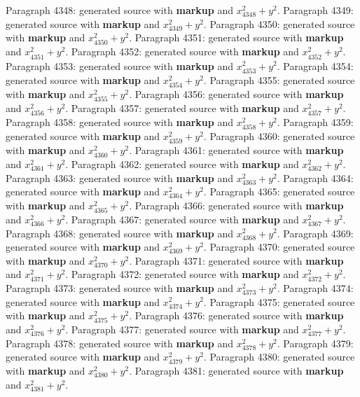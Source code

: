 \documentclass{article}
\begin{document}
Paragraph 4348: generated source with \textbf{markup} and $x_{4348}^2 + y^2$.
Paragraph 4349: generated source with \textbf{markup} and $x_{4349}^2 + y^2$.
Paragraph 4350: generated source with \textbf{markup} and $x_{4350}^2 + y^2$.
Paragraph 4351: generated source with \textbf{markup} and $x_{4351}^2 + y^2$.
Paragraph 4352: generated source with \textbf{markup} and $x_{4352}^2 + y^2$.
Paragraph 4353: generated source with \textbf{markup} and $x_{4353}^2 + y^2$.
Paragraph 4354: generated source with \textbf{markup} and $x_{4354}^2 + y^2$.
Paragraph 4355: generated source with \textbf{markup} and $x_{4355}^2 + y^2$.
Paragraph 4356: generated source with \textbf{markup} and $x_{4356}^2 + y^2$.
Paragraph 4357: generated source with \textbf{markup} and $x_{4357}^2 + y^2$.
Paragraph 4358: generated source with \textbf{markup} and $x_{4358}^2 + y^2$.
Paragraph 4359: generated source with \textbf{markup} and $x_{4359}^2 + y^2$.
Paragraph 4360: generated source with \textbf{markup} and $x_{4360}^2 + y^2$.
Paragraph 4361: generated source with \textbf{markup} and $x_{4361}^2 + y^2$.
Paragraph 4362: generated source with \textbf{markup} and $x_{4362}^2 + y^2$.
Paragraph 4363: generated source with \textbf{markup} and $x_{4363}^2 + y^2$.
Paragraph 4364: generated source with \textbf{markup} and $x_{4364}^2 + y^2$.
Paragraph 4365: generated source with \textbf{markup} and $x_{4365}^2 + y^2$.
Paragraph 4366: generated source with \textbf{markup} and $x_{4366}^2 + y^2$.
Paragraph 4367: generated source with \textbf{markup} and $x_{4367}^2 + y^2$.
Paragraph 4368: generated source with \textbf{markup} and $x_{4368}^2 + y^2$.
Paragraph 4369: generated source with \textbf{markup} and $x_{4369}^2 + y^2$.
Paragraph 4370: generated source with \textbf{markup} and $x_{4370}^2 + y^2$.
Paragraph 4371: generated source with \textbf{markup} and $x_{4371}^2 + y^2$.
Paragraph 4372: generated source with \textbf{markup} and $x_{4372}^2 + y^2$.
Paragraph 4373: generated source with \textbf{markup} and $x_{4373}^2 + y^2$.
Paragraph 4374: generated source with \textbf{markup} and $x_{4374}^2 + y^2$.
Paragraph 4375: generated source with \textbf{markup} and $x_{4375}^2 + y^2$.
Paragraph 4376: generated source with \textbf{markup} and $x_{4376}^2 + y^2$.
Paragraph 4377: generated source with \textbf{markup} and $x_{4377}^2 + y^2$.
Paragraph 4378: generated source with \textbf{markup} and $x_{4378}^2 + y^2$.
Paragraph 4379: generated source with \textbf{markup} and $x_{4379}^2 + y^2$.
Paragraph 4380: generated source with \textbf{markup} and $x_{4380}^2 + y^2$.
Paragraph 4381: generated source with \textbf{markup} and $x_{4381}^2 + y^2$.
\end{document}
